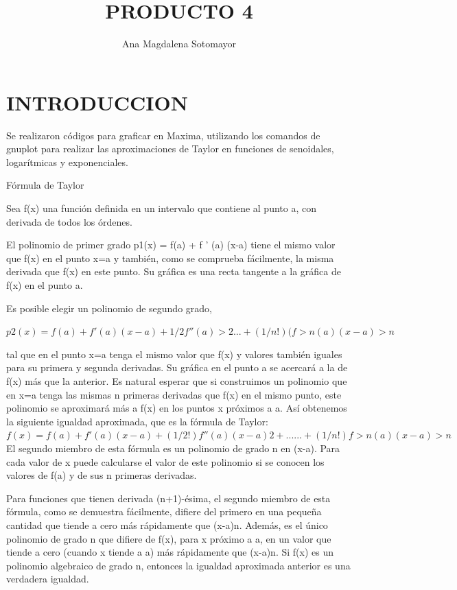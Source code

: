 \documentclass[letterpaper,10pt,twoside,onecolumn]{article}
\begin{document}
 
\title{PRODUCTO 4} 
\author{Ana Magdalena Sotomayor} 

\maketitle 
\section{INTRODUCCION}
Se realizaron códigos para graficar en Maxima, utilizando los comandos de gnuplot para realizar las aproximaciones de Taylor en funciones de senoidales, logarítmicas y exponenciales. 

Fórmula de Taylor

Sea f(x) una función definida en un intervalo que contiene al punto a, con derivada de todos los órdenes.

El polinomio de primer grado p1(x) = f(a) + f ' (a) (x-a) tiene el mismo valor que f(x) en el punto x=a y también, como se comprueba fácilmente, la misma derivada que f(x) en este punto. Su gráfica es una recta tangente a la gráfica de f(x) en el punto a.

Es posible elegir un polinomio de segundo grado,

 $p2(x) = f(a)+f'(a)(x-a)+1/2f''(a)>2...+(1/n!)(f>n(a)(x-a)>n$

tal que en el punto x=a tenga el mismo valor que f(x) y valores también iguales para su primera y segunda derivadas. Su gráfica en el punto a se acercará a la de f(x) más que la anterior. Es natural esperar que si construimos un polinomio que en x=a tenga las mismas n primeras derivadas que f(x) en el mismo punto, este polinomio se aproximará más a f(x) en los puntos x próximos a a. Así obtenemos la siguiente igualdad aproximada, que es la fórmula de Taylor:
$f(x) = f(a) + f'(a)(x-a) + (1/2!)f''(a)(x-a)2+ ...... + (1/n!)f>n(a)(x-a)>n$
El segundo miembro de esta fórmula es un polinomio de grado n en (x-a). Para cada valor de x puede calcularse el valor de este polinomio si se conocen los valores de f(a) y de sus n primeras derivadas.

Para funciones que tienen derivada (n+1)-ésima, el segundo miembro de esta fórmula, como se demuestra fácilmente, difiere del primero en una pequeña cantidad que tiende a cero más rápidamente que (x-a)n. Además, es el único polinomio de grado n que difiere de f(x), para x próximo a a, en un valor que tiende a cero (cuando x tiende a a) más rápidamente que (x-a)n.
Si f(x) es un polinomio algebraico de grado n, entonces la igualdad aproximada anterior es una verdadera igualdad.
\end{document}
